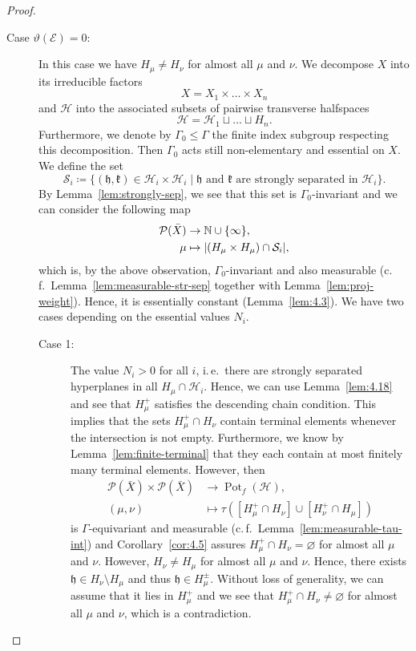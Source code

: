 \begin{proof}
\begin{description}
  \item[Case \(\vartheta(\mathcal{E})=0\):] In this case we have \(H_\mu \neq H_\nu\) for almost all \(\mu\) and \(\nu\). We decompose \(X\) into its irreducible factors
    \[
      X = X_1 \times \dots \times X_n
    \]
    and \(\mathcal{H}\) into the associated subsets of pairwise transverse halfspaces
    \[
      \mathcal{H} = \mathcal{H}_1 \sqcup \dots \sqcup H_n.
    \]
    Furthermore, we denote by \(\Gamma_0 \leq \Gamma\) the finite index subgroup respecting this decomposition. Then \(\Gamma_0\) acts still non-elementary and essential on \(X\). We define the set
    \[
      \mathcal{S}_i \coloneqq \{(\mathfrak{h}, \mathfrak{k}) \in \mathcal{H}_i \times \mathcal{H}_i \mid \mathfrak{h} \text{ and } \mathfrak{k} \text{ are strongly separated in } \mathcal{H}_i\}.
    \]
    By Lemma~\ref{lem:strongly-sep}, we see that this set is \(\Gamma_0\)-invariant and we can consider the following map
    \begin{align*}
      \mathcal{P}(\bar X) &\to \mathbb{N} \cup \{\infty\},\\
      \mu &\mapsto |(H_\mu \times H_\mu) \cap \mathcal{S}_i|,
    \end{align*}
    which is, by the above observation, \(\Gamma_0\)-invariant and also measurable (c.\,f.\ Lemma\ \ref{lem:measurable-str-sep} together with Lemma\ \ref{lem:proj-weight}). Hence, it is essentially constant (Lemma~\ref{lem:4.3}). We have two cases depending on the essential values \(N_i\).
    \begin{description}
    \item[Case 1:] The value \(N_i > 0\) for all \(i\), i.\,e.\ there are strongly separated hyperplanes in all \(H_\mu \cap \mathcal{H}_i\). Hence, we can use Lemma~\ref{lem:4.18} and see that \(H_\mu^+\) satisfies the descending chain condition. This implies that the sets \(H_\mu^+ \cap H_\nu\) contain terminal elements whenever the intersection is not empty. Furthermore, we know by Lemma~\ref{lem:finite-terminal} that they each contain at most finitely many terminal elements. However, then
      \begin{align*}
        \mathcal{P}(\bar X) \times \mathcal{P}(\bar X) &\to \operatorname{Pot}_f(\mathcal{H}),\\
        (\mu,\nu) &\mapsto \tau([H_\mu^+ \cap H_\nu] \cup [H_\nu^+ \cap H_\mu])
      \end{align*}
      is \(\Gamma\)-equivariant and measurable (c.\,f.\ Lemma~\ref{lem:measurable-tau-int}) and Corollary~\ref{cor:4.5} assures \(H_\mu^+ \cap H_\nu = \varnothing\) for almost all \(\mu\) and \(\nu\). However, \(H_\nu \neq H_\mu\) for almost all \(\mu\) and \(\nu\). Hence, there exists \(\mathfrak{h} \in H_\nu \setminus H_\mu\) and thus \(\mathfrak{h} \in H_\mu^\pm\). Without loss of generality, we can assume that it lies in \(H_\mu^+\) and we see that \(H_\mu^+ \cap H_\nu \neq \varnothing\) for almost all \(\mu\) and \(\nu\), which is a contradiction.

\end{description}
\end{description}
\end{proof}
